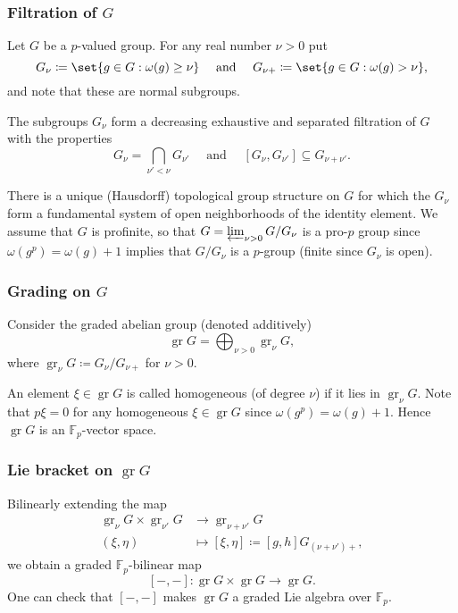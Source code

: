 \documentclass{beamer}
\newcommand*\F{\mathbb{F}}
\DeclareMathOperator{\gr}{gr} %
\newcommand*\defeq{\coloneqq}
\renewcommand*\projlim{\varprojlim}
\newcommand*\edot{{-}}
\begin{document}
\begin{frame}
  \frametitle{Filtration of $G$}

  Let $G$ be a $p$-valued group. For any real number $\nu > 0$ put
  \[
    G_{\nu} \defeq \set{ g \in G : \omega(g) \geq \nu } \quad \text{ and } \quad G_{\nu+} \defeq \set{ g \in G : \omega(g) > \nu },
  \]
  and note that these are normal subgroups.

  The subgroups $G_{\nu}$ form a decreasing exhaustive and separated filtration of $G$ with the properties
  \[
    G_{\nu} = \bigcap_{\nu' < \nu} G_{\nu'} \quad \text{ and } \quad [G_{\nu},G_{\nu'}] \subseteq G_{\nu+\nu'}.
  \]

  There is a unique (Hausdorff) topological group structure on $G$ for which the $G_{\nu}$ form a fundamental system of open neighborhoods of the identity element. We assume that $G$ is profinite, so that $G = \projlim_{\nu>0} G/G_{\nu}$ is a pro-$p$ group since $\omega(g^{p}) = \omega(g)+1$ implies that $G/G_{\nu}$ is a $p$-group (finite since $G_{\nu}$ is open).
\end{frame}

\begin{frame}
  \frametitle{Grading on $G$}

  Consider the graded abelian group (denoted additively) \[ \gr G = \bigoplus_{\nu>0} \gr_{\nu} G, \] where $\gr_{\nu} G \defeq G_{\nu}/G_{\nu+}$ for $\nu>0$.


  An element $\xi \in \gr G$ is called homogeneous (of degree $\nu$) if it lies in $\gr_{\nu} G$. Note that $p \xi = 0$ for any homogeneous $\xi \in \gr G$ since $\omega(g^{p}) = \omega(g)+1$. Hence $\gr G$ is an $\F_{p}$-vector space.
\end{frame}

\begin{frame}
  \frametitle{Lie bracket on $\gr G$}

  Bilinearly extending the map
  \begin{align*}
    \gr_{\nu} G \times \gr_{\nu'} G &\to \gr_{\nu+\nu'} G \\
    (\xi,\eta) &\mapsto [\xi,\eta] \defeq [g,h]G_{(\nu+\nu')+},
  \end{align*}
  we obtain a graded $\F_{p}$-bilinear map
  \[
    [\edot,\edot] \colon \gr G \times \gr G \to \gr G.
  \]
  One can check that $[\edot,\edot]$ makes $\gr G$ a graded Lie algebra over $\F_{p}$.
\end{frame}
\end{document}

